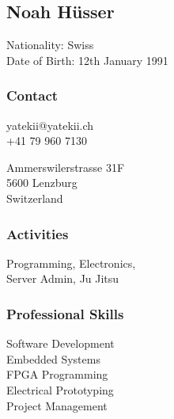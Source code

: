 \begin{facts}
    \sectionsep
    \section{Noah Hüsser}
    Nationality: Swiss\\
    Date of Birth: 12th January 1991
    \sectionsep
    
    \subsubsection{Contact}
    yatekii@yatekii.ch\\
    +41 79 960 7130\par
    \vspace{\baselineskip}
    Ammerswilerstrasse 31F\\
    5600 Lenzburg\\
    Switzerland
    \sectionsep
    
    \subsubsection{Activities}
    Programming, Electronics,\\
    Server Admin, Ju Jitsu
    \sectionsep
    
    \subsubsection{Professional Skills}
    Software Development\\
    Embedded Systems\\
    FPGA Programming\\
    Electrical Prototyping\\
    Project Management
    \sectionsep
    

\end{facts}
